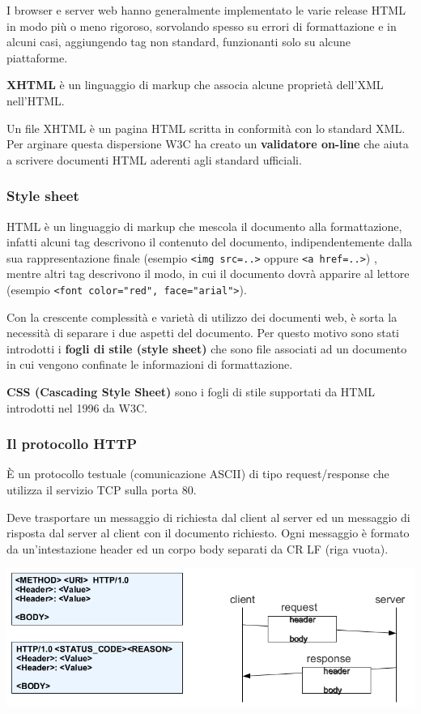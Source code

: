             I browser e server web hanno generalmente implementato le varie release HTML in modo più o meno rigoroso, sorvolando spesso su errori di formattazione e in alcuni casi, aggiungendo tag non standard, funzionanti solo su alcune piattaforme.

            \textbf{XHTML} è un linguaggio di markup che associa alcune proprietà dell'XML nell'HTML.

            Un file XHTML è un pagina HTML scritta in conformità con lo standard XML. Per arginare questa dispersione W3C ha creato un \textbf{validatore on-line} che aiuta a scrivere documenti HTML aderenti agli standard ufficiali.

        \subsubsection{Style sheet}
            HTML è un linguaggio di markup che mescola il documento alla formattazione, infatti alcuni tag descrivono il contenuto del documento, indipendentemente dalla sua rappresentazione finale (esempio \verb:<img src=..>: oppure \verb:<a href=..>:) , mentre altri tag descrivono il modo, in cui il documento dovrà apparire al lettore (esempio \verb:<font color="red", face="arial">:).

            Con la crescente complessità e varietà di utilizzo dei documenti web, è sorta la necessità di separare i due aspetti del documento. Per questo motivo sono stati introdotti i \textbf{fogli di stile (style sheet)} che sono file associati ad un documento in cui vengono confinate le informazioni di formattazione.

            \textbf{CSS (Cascading Style Sheet)} sono i fogli di stile supportati da HTML introdotti nel 1996 da W3C.

        \subsubsection{Il protocollo HTTP}
            È un protocollo testuale (comunicazione ASCII) di tipo request/response che utilizza il servizio TCP sulla porta 80.
        
            Deve trasportare un messaggio di richiesta dal client al server ed un messaggio di risposta dal server al client con il documento richiesto. Ogni messaggio è formato da un'intestazione header ed un corpo body separati da CR LF (riga vuota).

            \begin{center}
                \includegraphics[scale=0.43]{chapters/6/assets/schema_m.png}
            \end{center}

